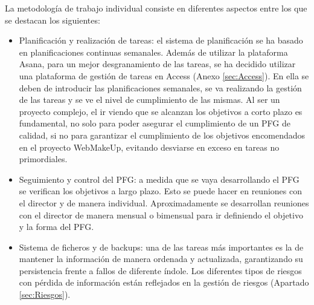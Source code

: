 La metodología de trabajo individual consiste en diferentes aspectos entre los que se destacan los siguientes:
\begin{itemize}
\item{Planificación y realización de tareas: el sistema de planificación se ha basado en planificaciones continuas semanales. Además de utilizar la plataforma Asana, para un mejor desgranamiento de las tareas, se ha decidido utilizar una plataforma de gestión de tareas en Access (Anexo \ref{sec:Access}). En ella se deben de introducir las planificaciones semanales, se va realizando la gestión de las tareas y se ve el nivel de cumplimiento de las mismas. Al ser un proyecto complejo, el ir viendo que se alcanzan los objetivos a corto plazo es fundamental, no solo para poder asegurar el cumplimiento de un PFG de calidad, si no para garantizar el cumplimiento de los objetivos encomendados en el proyecto WebMakeUp, evitando desviarse en exceso en tareas no primordiales.}
\item{Seguimiento y control del PFG: a medida que se vaya desarrollando el PFG se verifican los objetivos a largo plazo. Esto se puede hacer en reuniones con el director y de manera individual. Aproximadamente se desarrollan reuniones con el director de manera mensual o bimensual para ir definiendo el objetivo y la forma del PFG.}
\item{Sistema de ficheros y de backups: una de las tareas más importantes es la de mantener la información de manera ordenada y actualizada, garantizando su persistencia frente a fallos de diferente índole. Los diferentes tipos de riesgos con pérdida de información están reflejados en la gestión de riesgos (Apartado \ref{sec:Riesgos}).

}
\end{itemize}
